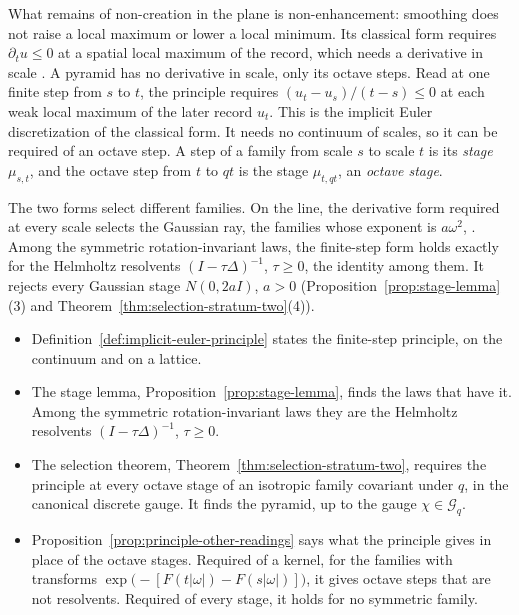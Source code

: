What remains of non-creation in the plane is non-enhancement: smoothing does not raise a local
maximum or lower a local minimum. Its classical form requires $\partial_tu \le 0$ at a spatial local
maximum of the record, which needs a derivative in scale
. A pyramid has no derivative in scale, only its octave
steps. Read at one finite step from $s$ to $t$, the principle requires $(u_t - u_s)/(t - s) \le 0$
at each weak local maximum of the later record $u_t$. This is the implicit Euler discretization of
the classical form. It needs no continuum of scales, so it can be required of an octave step. A
step of a family from scale $s$ to scale $t$ is its \emph{stage} $\mu_{s,t}$, and the octave step
from $t$ to $qt$ is the stage $\mu_{t,qt}$, an \emph{octave stage}.

The two forms select different families. On the line, the derivative form required at every scale
selects the Gaussian ray, the families whose exponent is $a\omega^2$,
. Among the symmetric
rotation-invariant laws, the finite-step form holds exactly for the Helmholtz resolvents
$(I - \tau\Delta)^{-1}$, $\tau \ge 0$, the identity among them. It rejects every Gaussian stage
$N(0, 2aI)$, $a > 0$ (Proposition~\ref{prop:stage-lemma}(3) and
Theorem~\ref{thm:selection-stratum-two}(4)).
\begin{itemize}
\item Definition~\ref{def:implicit-euler-principle} states the finite-step principle, on the
continuum and on a lattice.
\item The stage lemma, Proposition~\ref{prop:stage-lemma}, finds the laws that have it. Among the
symmetric rotation-invariant laws they are the Helmholtz resolvents $(I - \tau\Delta)^{-1}$,
$\tau \ge 0$.
\item The selection theorem, Theorem~\ref{thm:selection-stratum-two}, requires the principle at
every octave stage of an isotropic family covariant under $q$, in the canonical discrete gauge. It
finds the \Matern{} pyramid, up to the gauge $\chi \in \mathcal{G}_q$.
\item Proposition~\ref{prop:principle-other-readings} says what the principle gives in place of the
octave stages. Required of a kernel, for the families with transforms
$\exp\bigl(-[F(t|\omega|) - F(s|\omega|)]\bigr)$, it gives octave steps that are not resolvents.
Required of every stage, it holds for no symmetric family.
\end{itemize}

